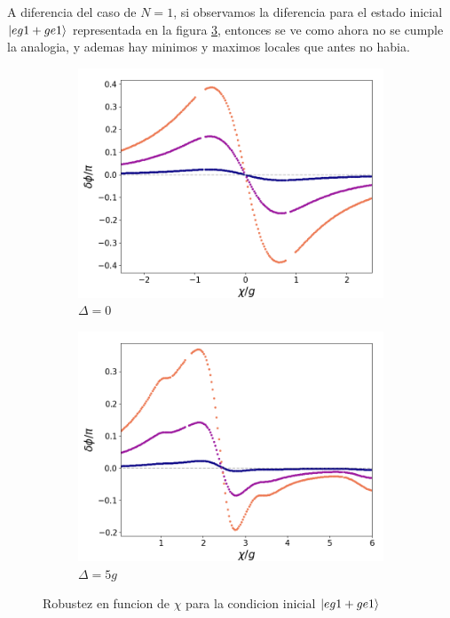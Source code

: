 A diferencia del caso de $N=1$, si observamos la diferencia para el estado inicial $\ket{eg1+ge1}$ representada en la figura \ref{fig5:robustez kerr eg1}, entonces se ve como ahora no se cumple la analogia, y ademas hay minimos y maximos locales que antes no habia. 

\begin{figure}[h]
    \centering
    \begin{subfigure}{0.49\textwidth}
        \includegraphics[width=\textwidth]{figuras/ch5/robustez/chi/eg1+ge1 chi zoom.png}
        \caption{$\Delta=0$}
        \label{fig5:robustez kerr 1 eg1}
    \end{subfigure}
    \hfill
    \begin{subfigure}{0.49\textwidth}
        \includegraphics[width=\textwidth]{figuras/ch5/robustez/chi/eg1+ge1 chi d=5.0g.png}
        \caption{$\Delta=5g$}
        \label{fig5:robustez kerr 2 eg1}
    \end{subfigure}
    \caption{Robustez en funcion de $\chi$ para la condicion inicial $\ket{eg1+ge1}$}
    \label{fig5:robustez kerr eg1}
\end{figure}


